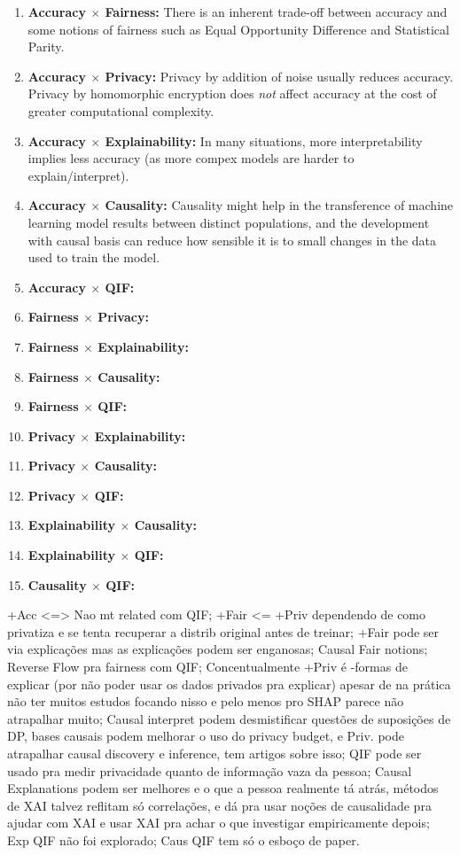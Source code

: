 \documentclass{article}
\begin{document}
\begin{enumerate}
    \item \textbf{Accuracy $\times$ Fairness:} There is an inherent trade-off between accuracy and some notions of fairness such as Equal Opportunity Difference and Statistical Parity.
    \item \textbf{Accuracy $\times$ Privacy:} Privacy by addition of noise usually reduces accuracy. Privacy by homomorphic encryption does \emph{not} affect accuracy at the cost of greater computational complexity.
    \item \textbf{Accuracy $\times$ Explainability:} In many situations, more interpretability implies less accuracy (as more compex models are harder to explain/interpret).
    \item \textbf{Accuracy $\times$ Causality:} Causality might help in the transference of machine learning model results between distinct populations, and the development with causal basis can reduce how sensible it is to small changes in the data used to train the model.
    \item \textbf{Accuracy $\times$ QIF:} 
    \item \textbf{Fairness $\times$ Privacy:} 
    \item \textbf{Fairness $\times$ Explainability:} 
    \item \textbf{Fairness $\times$ Causality:} 
    \item \textbf{Fairness $\times$ QIF:} 
    \item \textbf{Privacy $\times$ Explainability:} 
    \item \textbf{Privacy $\times$ Causality:} 
    \item \textbf{Privacy $\times$ QIF:} 
    \item \textbf{Explainability $\times$ Causality:} 
    \item \textbf{Explainability $\times$ QIF:} 
    \item \textbf{Causality $\times$ QIF:} 
\end{enumerate}

{\color{red}  +Acc <=> Nao mt related com QIF; +Fair <= +Priv dependendo de como privatiza e se tenta recuperar a distrib original antes de treinar; +Fair pode ser via explicações mas as explicações podem ser enganosas; Causal Fair notions; Reverse Flow pra fairness com QIF; Concentualmente +Priv é -formas de explicar (por não poder usar os dados privados pra explicar) apesar de na prática não ter muitos estudos focando nisso e pelo menos pro SHAP parece não atrapalhar muito; Causal interpret podem desmistificar questões de suposições de DP, bases causais podem melhorar o uso do privacy budget, e Priv. pode atrapalhar causal discovery e inference, tem artigos sobre isso; QIF pode ser usado pra medir privacidade quanto de informação vaza da pessoa; Causal Explanations podem ser melhores e o que a pessoa realmente tá atrás, métodos de XAI talvez reflitam só correlações, e dá pra usar noções de causalidade pra ajudar com XAI e usar XAI pra achar o que investigar empiricamente depois; Exp QIF não foi explorado; Caus QIF tem só o esboço de paper.}
\end{document}
